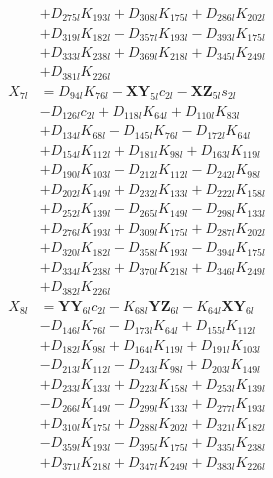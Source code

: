 \begin{multicols}{2}
\begin{align}
&+ D_{275l}K_{193l} + D_{308l}K_{175l} + D_{286l}K_{202l}  \nonumber \\
&+ D_{319l}K_{182l} - D_{357l}K_{193l} - D_{393l}K_{175l}  \nonumber \\
&+ D_{333l}K_{238l} + D_{369l}K_{218l} + D_{345l}K_{249l}  \nonumber \\
&+ D_{381l}K_{226l} \nonumber \\
X_{7l} &= D_{94l}K_{76l} - \mathbf{XY}_{5l}c_{2l} - \mathbf{XZ}_{5l}s_{2l}  \nonumber \\
&- D_{126l}c_{2l} + D_{118l}K_{64l} + D_{110l}K_{83l}  \nonumber \\
&+ D_{134l}K_{68l} - D_{145l}K_{76l} - D_{172l}K_{64l}  \nonumber \\
&+ D_{154l}K_{112l} + D_{181l}K_{98l} + D_{163l}K_{119l}  \nonumber \\
&+ D_{190l}K_{103l} - D_{212l}K_{112l} - D_{242l}K_{98l}  \nonumber \\
&+ D_{202l}K_{149l} + D_{232l}K_{133l} + D_{222l}K_{158l}  \nonumber \\
&+ D_{252l}K_{139l} - D_{265l}K_{149l} - D_{298l}K_{133l}  \nonumber \\
&+ D_{276l}K_{193l} + D_{309l}K_{175l} + D_{287l}K_{202l}  \nonumber \\
&+ D_{320l}K_{182l} - D_{358l}K_{193l} - D_{394l}K_{175l}  \nonumber \\
&+ D_{334l}K_{238l} + D_{370l}K_{218l} + D_{346l}K_{249l}  \nonumber \\
&+ D_{382l}K_{226l} \nonumber \\
X_{8l} &= \mathbf{YY}_{6l}c_{2l} - K_{68l}\mathbf{YZ}_{6l} - K_{64l}\mathbf{XY}_{6l}  \nonumber \\
&- D_{146l}K_{76l} - D_{173l}K_{64l} + D_{155l}K_{112l}  \nonumber \\
&+ D_{182l}K_{98l} + D_{164l}K_{119l} + D_{191l}K_{103l}  \nonumber \\
&- D_{213l}K_{112l} - D_{243l}K_{98l} + D_{203l}K_{149l}  \nonumber \\
&+ D_{233l}K_{133l} + D_{223l}K_{158l} + D_{253l}K_{139l}  \nonumber \\
&- D_{266l}K_{149l} - D_{299l}K_{133l} + D_{277l}K_{193l}  \nonumber \\
&+ D_{310l}K_{175l} + D_{288l}K_{202l} + D_{321l}K_{182l}  \nonumber \\
&- D_{359l}K_{193l} - D_{395l}K_{175l} + D_{335l}K_{238l}  \nonumber \\
&+ D_{371l}K_{218l} + D_{347l}K_{249l} + D_{383l}K_{226l}  \nonumber \\

\end{align}
\end{multicols}
